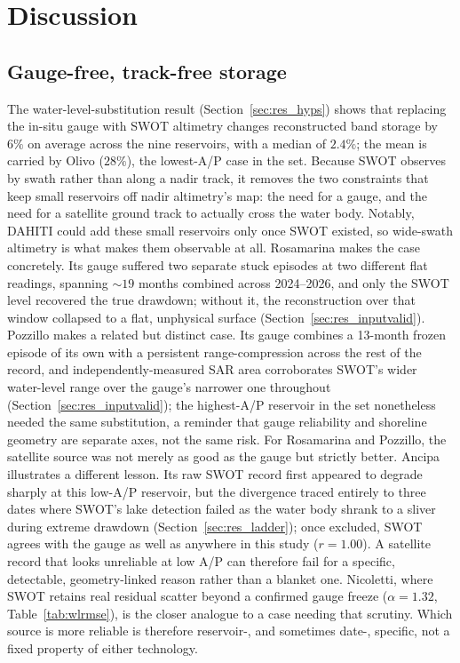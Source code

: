 \section{Discussion}
\label{sec:discussion}

\subsection{Gauge-free, track-free storage}
The water-level-substitution result (Section~\ref{sec:res_hyps}) shows that
replacing the in-situ gauge with SWOT altimetry changes reconstructed band storage by
$6\%$ on average across the nine reservoirs, with a median of $2.4\%$; the mean is
carried by Olivo ($28\%$), the lowest-A/P case in the set. Because SWOT observes by swath rather than along a
nadir track, it removes the two constraints that keep small reservoirs off nadir
altimetry's map: the need for a gauge, and the need for a satellite ground track to
actually cross the water body. Notably, DAHITI could add these small reservoirs only
once SWOT existed, so wide-swath altimetry is what makes them observable at all.
Rosamarina makes the case concretely. Its gauge suffered two separate stuck episodes
at two different flat readings, spanning ${\sim}19$ months combined across
2024--2026, and only the SWOT level recovered the true drawdown; without it, the
reconstruction over that window collapsed to a flat, unphysical surface
(Section~\ref{sec:res_inputvalid}). Pozzillo makes a related but distinct case.
Its gauge combines a 13-month frozen episode of its own with a persistent
range-compression across the rest of the record, and independently-measured SAR area
corroborates SWOT's wider water-level range over the gauge's narrower one throughout
(Section~\ref{sec:res_inputvalid}); the highest-A/P reservoir in the set nonetheless
needed the same substitution, a reminder that gauge reliability and shoreline
geometry are separate axes, not the same risk. For Rosamarina and Pozzillo, the
satellite source was not merely as good as the gauge but strictly better. Ancipa
illustrates a different lesson. Its raw SWOT record first appeared to degrade sharply
at this low-A/P reservoir, but the divergence traced entirely to three dates where
SWOT's lake detection failed as the water body shrank to a sliver during extreme
drawdown (Section~\ref{sec:res_ladder}); once excluded, SWOT agrees with the gauge as
well as anywhere in this study ($r=1.00$). A satellite record that looks unreliable at
low A/P can therefore fail for a specific, detectable, geometry-linked reason rather
than a blanket one. Nicoletti, where SWOT retains real residual scatter beyond a
confirmed gauge freeze ($\alpha=1.32$, Table~\ref{tab:wlrmse}), is the closer analogue
to a case needing that scrutiny. Which source is more reliable is therefore
reservoir-, and sometimes date-, specific, not a fixed property of either technology.

